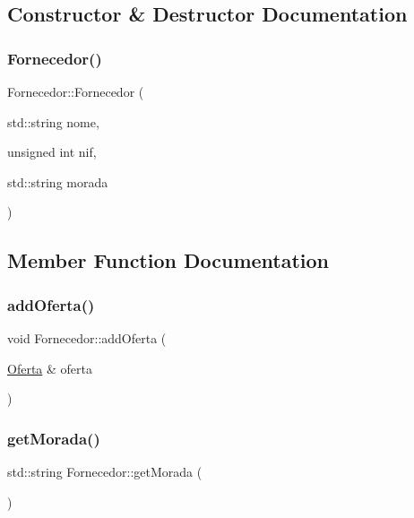 \subsection{Constructor \& Destructor Documentation}
\mbox{\label{classFornecedor_a0cbc4556289cc946756039ab0da52756}} 
\subsubsection{\texorpdfstring{Fornecedor()}{Fornecedor()}}
{\footnotesize\ttfamily Fornecedor\+::\+Fornecedor (\begin{DoxyParamCaption}\item[{std\+::string}]{nome,  }\item[{unsigned int}]{nif,  }\item[{std\+::string}]{morada }\end{DoxyParamCaption})}



\subsection{Member Function Documentation}
\mbox{\label{classFornecedor_a220373fd19f44a30d7c6c1ec913be700}} 
\subsubsection{\texorpdfstring{add\+Oferta()}{addOferta()}}
{\footnotesize\ttfamily void Fornecedor\+::add\+Oferta (\begin{DoxyParamCaption}\item[{\hyperlink{classOferta}{Oferta} \&}]{oferta }\end{DoxyParamCaption})}

\mbox{\label{classFornecedor_ae71fba3a196f749f54956fdbb25ede6a}} 
\subsubsection{\texorpdfstring{get\+Morada()}{getMorada()}}
{\footnotesize\ttfamily std\+::string Fornecedor\+::get\+Morada (\begin{DoxyParamCaption}{ }\end{DoxyParamCaption})\hspace{0.3cm}{\ttfamily [inline]}}

